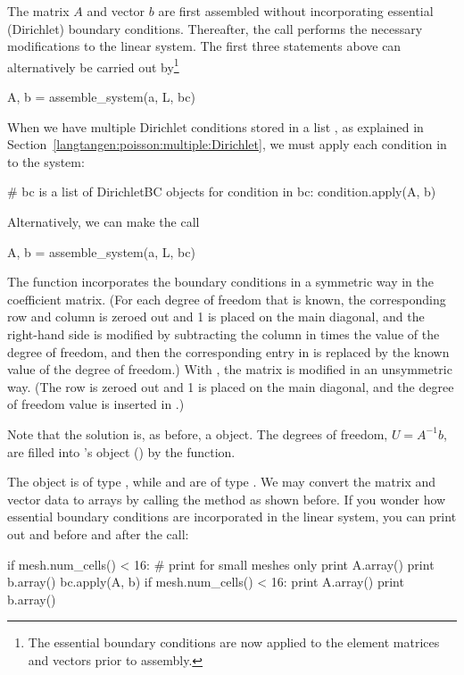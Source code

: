 The matrix $A$ and vector $b$ are first assembled without
incorporating essential (Dirichlet) boundary conditions. Thereafter,
the  call performs the necessary modifications to
the linear system. The first three statements above can alternatively
be carried out by\footnote{The
  essential boundary conditions are now applied to the element matrices
  and vectors prior to assembly.}
\begin{python}
A, b = assemble_system(a, L, bc)
\end{python}

When we have multiple Dirichlet conditions stored in a list ,
as explained in Section~\ref{langtangen:poisson:multiple:Dirichlet},
we must apply each condition in  to the system:
\begin{python}
# bc is a list of DirichletBC objects
for condition in bc:
    condition.apply(A, b)
\end{python}
Alternatively, we can make the call
\begin{python}
A, b = assemble_system(a, L, bc)
\end{python}
The  function incorporates the boundary conditions
in a symmetric way in the coefficient matrix. (For each degree of freedom
that is known, the corresponding row and column is zeroed out and 1 is
placed on the main diagonal, and the right-hand side  is modified
by subtracting the column in  times the value of the degree of
freedom, and then the corresponding entry in  is replaced by the
known value of the degree of freedom.) With , the matrix  is modified in an unsymmetric way. (The row
is zeroed out and 1 is placed on the main diagonal, and the degree of
freedom value is inserted in .)

Note that the solution  is, as before, a  object.
The degrees of freedom, $U=A^{-1}b$, are filled into 's
 object () by the  function.

The object  is of type , while  and
 are of type . We may convert the matrix and
vector data to  arrays by calling the  method
as shown before. If you wonder how essential boundary conditions are
incorporated in the linear system, you can print out  and 
before and after the  call:
\begin{python}
if mesh.num_cells() < 16:  # print for small meshes only
    print A.array()
    print b.array()
bc.apply(A, b)
if mesh.num_cells() < 16:
    print A.array()
    print b.array()
\end{python}

